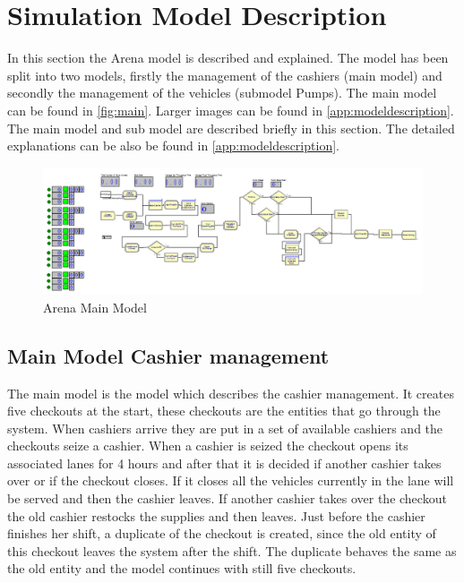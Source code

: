 \section{Simulation Model Description}

In this section the Arena model is described and explained. 
The model has been split into two models, firstly the management of the cashiers (main model) and secondly the management of the vehicles (submodel Pumps). 
The main model can be found in \autoref{fig:main}. 
Larger images can be found in \autoref{app:modeldescription}. 
The main model and sub model are described briefly in this section.
The detailed explanations can be also be found in \autoref{app:modeldescription}.  
\begin{figure}[h!]
\begin{center}
	\includegraphics[scale=0.6]{images/model-description/main}
	\caption{Arena Main Model}
	\label{fig:main}
\end{center}
\end{figure}
\subsection{Main Model Cashier management}
The main model is the model which describes the cashier management. 
It creates five checkouts at the start, these checkouts are the entities that go through the system. 
When cashiers arrive they are put in a set of available cashiers and the checkouts seize a cashier. 
When a cashier is seized the checkout opens its associated lanes for 4 hours and after that it is decided if another cashier takes over or if the checkout closes. 
If it closes all the vehicles currently in the lane will be served and then the cashier leaves. 
If another cashier takes over the checkout the old cashier restocks the supplies and then leaves. 
Just before the cashier finishes her shift, a duplicate of the checkout is created, since the old entity of this checkout leaves the system after the shift. 
The duplicate behaves the same as the old entity and the model continues with still five checkouts. 


